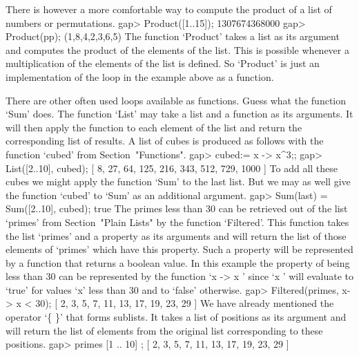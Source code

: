 
There is however a more comfortable way to  compute the product of a list
of numbers or permutations.
\beginexample
    gap> Product([1..15]);
    1307674368000
    gap> Product(pp);
    (1,8,4,2,3,6,5) 
\endexample
The function  `Product'  takes a  list as  its argument and computes  the
product  of  the  elements  of the  list.   This  is possible whenever  a
multiplication of  the elements of the list is defined.  So  `Product' is
just an implementation of the loop in the example above as a function.

There are other often used loops available as functions.   Guess what the
function `Sum' does.  The function `List' may  take a list and a function
as its arguments.  It will then apply the function to each element of the
list  and return  the corresponding list of results.   A list of cubes is
produced as follows with the function `cubed' from Section~"Functions".
\beginexample
    gap> cubed:= x -> x^3;;
    gap> List([2..10], cubed);
    [ 8, 27, 64, 125, 216, 343, 512, 729, 1000 ] 
\endexample
To add all these cubes  we might apply the  function  `Sum' to  the  last
list.  But we may  as well  give the  function  `cubed' to  `Sum'  as  an
additional argument.
\beginexample
    gap> Sum(last) = Sum([2..10], cubed);
    true 
\endexample
The  primes less than 30 can  be retrieved out  of the list `primes' from
Section~"Plain Lists" by the function `Filtered'. This function takes the
list `primes' and a property as its arguments and will return the list of
those elements of `primes' which have this property. Such a property will
be represented  by  a function  that  returns  a boolean  value. In  this
example the property  of  being less than  30 can be represented  by  the
function `x  -> x ' since `x ' will evaluate to `true'  for
values `x' less than 30 and to `false' otherwise.
\beginexample
    gap> Filtered(primes, x-> x < 30);
    [ 2, 3, 5, 7, 11, 13, 17, 19, 23, 29 ] 
\endexample
We have already  mentioned the operator `\{  \}' that  forms sublists. It
takes a  list of positions  as its argument  and will return  the list of
elements from the original list corresponding to these positions.
\beginexample
    gap> primes{ [1 .. 10] };
    [ 2, 3, 5, 7, 11, 13, 17, 19, 23, 29 ] 
\endexample

\null

